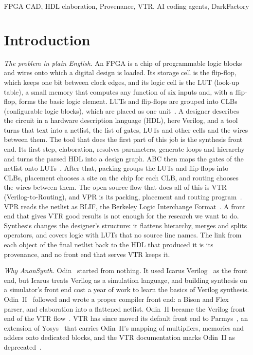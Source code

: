 \documentclass[conference]{IEEEtran}
\begin{document}
\begin{IEEEkeywords}
FPGA CAD, HDL elaboration, Provenance, VTR, AI coding agents, DarkFactory
\end{IEEEkeywords}


\section{Introduction}
\label{sec:intro}

\emph{The problem in plain English.}
An FPGA is a chip of programmable logic blocks and wires onto which a digital design is loaded. %
Its storage cell is the flip-flop, which keeps one bit between clock edges, %
and its logic cell is the LUT (look-up table), a small memory that computes any function of six inputs and, with a flip-flop, forms the basic logic element. %
LUTs and flip-flops are grouped into CLBs (configurable logic blocks), which are placed as one unit~\cite{luuthesis}. %
A designer describes the circuit in a hardware description language (HDL), here Verilog, %
and a tool turns that text into a netlist, the list of gates, LUTs and other cells and the wires between them. %
The tool that does the first part of this job is the synthesis front end. %
Its first step, elaboration, resolves parameters, generate loops and hierarchy and turns the parsed HDL into a design graph. %
ABC then maps the gates of the netlist onto LUTs~\cite{brayton2010abc}. %
After that, packing groups the LUTs and flip-flops into CLBs, placement chooses a site on the chip for each CLB, and routing chooses the wires between them. %
The open-source flow that does all of this is VTR (Verilog-to-Routing), and VPR is its packing, placement and routing program~\cite{anon11,luuthesis}. %
VPR reads the netlist as BLIF, the Berkeley Logic Interchange Format~\cite{blif}. %
A front end that gives VTR good results is not enough for the research we want to do. %
Synthesis changes the designer's structure: it flattens hierarchy, merges and splits operators, and covers logic with LUTs that no source line names. %
The link from each object of the final netlist back to the HDL that produced it is its provenance, %
and no front end that serves VTR keeps it.

\emph{Why AnonSynth.}
Odin~\cite{anon09} started from nothing. It used Icarus Verilog~\cite{icarus} as the front end, but Icarus treats Verilog as a simulation language, and building synthesis on a simulator's front end cost a year of work to learn the basics of Verilog synthesis. Odin~II~\cite{anon10} followed and wrote a proper compiler front end: a Bison and Flex parser, and elaboration into a flattened netlist. Odin~II became the Verilog front end of the VTR flow~\cite{anon11,luu2014vtr7}. VTR has since moved its default front end to Parmys~\cite{parmys}, an extension of Yosys~\cite{wolf2013yosys,yosys} that carries Odin~II's mapping of multipliers, memories and adders onto dedicated blocks, and the VTR documentation marks Odin~II as deprecated~\cite{vtrodindoc}. %
\end{document}
